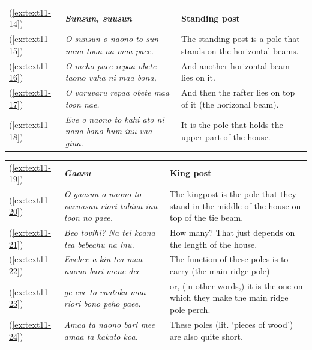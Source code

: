 \documentclass[output=paper]{langscibook}
\begin{document}
\begin{xltabular}{\textwidth}{lXX}
    (\ref{ex:text11-14})&\textit{\textbf{Sunsun, suusun}}&\textbf{Standing post}\\
    (\ref{ex:text11-15})&\textit{O sunsun o naono to sun nana toon na maa paee.}&The standing post is a pole that stands on the horizontal beams.\\
    (\ref{ex:text11-16})&\textit{O meho paee repaa obete taono vaha ni maa bona,}&And another horizontal beam lies on it.\\
    (\ref{ex:text11-17})&\textit{O varuvaru repaa obete maa toon nae.}&And then the rafter lies on top of it (the horizonal beam).\\
    (\ref{ex:text11-18})&\textit{Eve o naono to kahi ato ni nana bono hum inu vaa gina.}&It is the pole that holds the upper part of the house.\\
\end{xltabular}
\begin{xltabular}{\textwidth}{lXX}
    (\ref{ex:text11-19})&\textit{\textbf{Gaasu}}&\textbf{King post}\\
    (\ref{ex:text11-20})&\textit{O gaasuu o naono to vavaasun riori tobina inu toon no paee.}&The kingpost is the pole that they stand in the middle of the house on top of  the tie beam.\\
    (\ref{ex:text11-21})&\textit{Beo tovihi? Na tei koana tea bebeahu na inu.}&How many? That just depends on the length of the house.\\
    (\ref{ex:text11-22})&\textit{Evehee a kiu tea maa naono bari mene dee}&The function of these poles is to carry (the main ridge pole)\\
    (\ref{ex:text11-23})&\textit{ge eve to vaatoka maa riori bono peho paee.}&or, (in other words,) it is the one on which they make the main ridge pole perch.\\
    (\ref{ex:text11-24})&\textit{Amaa ta naono bari mee amaa ta kakato koa.}&These poles (lit. `pieces of wood') are also quite short.\\
\end{xltabular}
\end{document}
